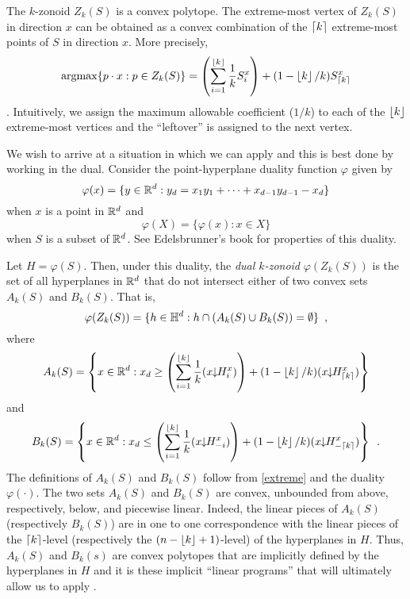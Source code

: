 \documentclass[lotsofwhite]{patmorin}
\newcommand{\argmax}{\mathrm{argmax}}
\newcommand{\drop}{\!\!\downarrow\!\!}
\newcommand{\dual}{\varphi}
\begin{document}
The $k$-zonoid $Z_k(S)$ is a convex polytope.  The extreme-most vertex
of $Z_k(S)$ in direction $x$ can be obtained as a convex combination of the
$\left\lceil k \right\rceil$ extreme-most points of $S$ in direction $x$.  More
precisely,
\begin{equation} 
\argmax\{p\cdot x: p\in Z_k(S)\} =
        \left(\sum_{i=1}^{\floor{k}} \frac{1}{k}S_i^x\right) +
          (1-\floor{k}/k)S_{\ceil{k}}^x  
          \eqlabel{extreme}
\end{equation}
\cite{beXX,gmXX}.  Intuitively, we assign the maximum allowable
coefficient ($1/k$) to each of the $\left\lfloor k \right\rfloor$ extreme-most vertices
and the ``leftover'' is assigned to the next vertex.

We wish to arrive at a situation in which we can apply 
and this is best done by working in the dual.
Consider the point-hyperplane duality function
$\dual$ given by 
\[
    \dual(x)=\{y\in\R^d : y_d = x_1y_1 +\cdots +x_{d-1}y_{d-1} - x_d \}
\] 
when $x$ is a point in $\mathbb{R}^d$ and
\[
     \dual(X) = \{\dual(x) : x\in X\}
\]
when $S$ is a subset of $\mathbb{R}^d$.  See Edelsbrunner's book \cite{eXX}
for properties of this duality. 

Let $H=\dual(S)$.  Then,
under this duality, the \emph{dual $k$-zonoid} $\dual(Z_k(S))$ is the set 
of all hyperplanes in $\mathbb{R}^d$
that do not intersect either of two convex sets $A_k(S)$ and $B_k(S)$.
That is,
\[
     \dual(Z_k(S)) = \{ h\in\Hy^d : h\cap(A_k(S)\cup B_k(S)) = \emptyset \} \enspace ,
\]
where
\begin{equation}
   A_k(S) = \left\{x\in\R^d: x_d \ge 
\left(\sum_{i=1}^{\floor{k}} \frac{1}{k}(x\drop H_i^x)\right) +
          (1-\floor{k}/k)(x\drop H_{\ceil{k}}^x) \right\}  \eqlabel{ra}
\end{equation} 
and
\begin{equation}
   B_k(S) = \left\{x\in\R^d: x_d \le 
\left(\sum_{i=1}^{\floor{k}} \frac{1}{k}(x\drop H_{-i}^x)\right) +
          (1-\floor{k}/k)(x\drop H_{-\ceil{k}}^x) \right\} \enspace .
\end{equation}
The definitions of $A_k(S)$ and $B_k(S)$ follow from \eqref{extreme}
and the duality $\dual(\cdot)$.
The two sets $A_k(S)$ and $B_k(S)$ are convex, unbounded from above,
respectively, below, and piecewise linear.  Indeed, the linear pieces
of $A_k(S)$ (respectively $B_k(S)$) are in one to one correspondence
with the linear pieces of the $\left\lceil k \right\rceil$-level (respectively
the $(n-\left\lfloor k \right\rfloor+1)$-level) of the hyperplanes in $H$.  Thus,
$A_k(S)$ and $B_k(s)$ are convex polytopes that are implicitly defined
by the hyperplanes in $H$ and it is these implicit ``linear programs''
that will ultimately allow us to apply .
\end{document}
